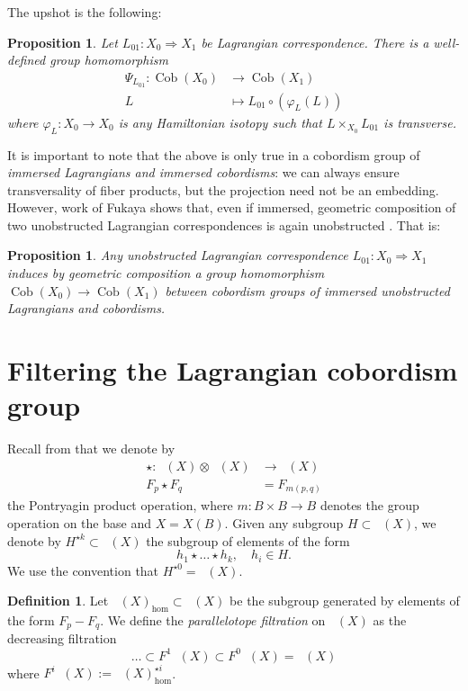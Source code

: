 \documentclass[10pt]{amsart}
\newtheorem{prop}[thm]{Proposition}
\theoremstyle{definition}
\newtheorem{definition}[thm]{Definition}
\theoremstyle{remark}
\DeclareMathOperator{\Cob}{Cob}
\DeclareMathOperator{\Cobfib}{\mathrm{Cob}_{\mathrm{fib}}}
\def\x{\times}
\begin{document}
The upshot is the following:
\begin{prop}\label{prop:hickshanlon}
    Let $L_{01}: X_0 \Rightarrow X_1$ be Lagrangian correspondence. 
    There is a well-defined group homomorphism
    \begin{align*}
        \Psi_{L_{01}}:\Cob(X_0) &\to \Cob(X_1)\\
        L &\mapsto L_{01} \circ (\varphi_L(L))
    \end{align*}
    where $\varphi_L: X_0 \to X_0$ is \emph{any} Hamiltonian isotopy such that $L \x_{X_0} L_{01}$ is transverse.
\end{prop}
It is important to note that the above is only true in a cobordism group of \emph{immersed Lagrangians and immersed cobordisms}: we can always ensure transversality of fiber products, but the projection need not be an embedding.
However, work of Fukaya shows that, even if immersed, geometric composition of two unobstructed Lagrangian correspondences is again unobstructed \cite{fukaya2017unobstructed}.
That is:
\begin{prop}
    Any unobstructed Lagrangian correspondence $L_{01}: X_0 \Rightarrow X_1$ induces by geometric composition a  group homomorphism $\Cob(X_0) \to \Cob(X_1)$ between cobordism groups of immersed unobstructed Lagrangians and cobordisms.
\end{prop} 
\section{Filtering the Lagrangian cobordism group}
Recall from  that we denote by
\begin{align*}
    \star: \Cobfib(X) \otimes \Cobfib(X) &\to \Cobfib(X)\\
    F_p \star F_q & = F_{m(p,q)}
\end{align*}
the Pontryagin product operation, where $m:B \x B \to B$ denotes the group operation on the base and $X = X(B)$.
Given any subgroup $H \subset \Cobfib(X)$, we denote by $H^{\star k} \subset \Cobfib(X)$ the subgroup of elements of the form 
$$
h_1\star\dots\star h_k,\quad h_i \in H.
$$
We use the convention that $H^{\star 0} = \Cobfib(X)$.

\begin{definition}\label{defn:filtration}
    Let $\Cobfib(X)_{\hom} \subset \Cobfib(X)$ be the subgroup generated by elements of the form $F_p - F_q$.
    We define the \emph{parallelotope filtration} on $\Cobfib(X)$
    as the decreasing filtration 
    $$
        \dots\subset F^1\Cobfib(X) \subset F^0\Cobfib(X) = \Cobfib(X)
    $$
    where $F^i\Cobfib(X) := \Cobfib(X)_{\hom}^{\star i}$.
\end{definition}
\end{document}

